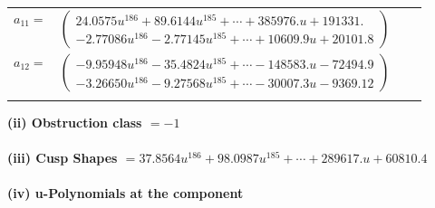\documentclass[1p]{elsarticle_modified}
\theoremstyle{definition}
\begin{document}
\begin{tabular}{m{7pt} m{180pt} m{7pt} m{180pt} }
\flushright $a_{11}=$&$\begin{pmatrix}24.0575 u^{186}+89.6144 u^{185}+\cdots+385976. u+191331.\\-2.77086 u^{186}-2.77145 u^{185}+\cdots+10609.9 u+20101.8\end{pmatrix}$ \\
\flushright $a_{12}=$&$\begin{pmatrix}-9.95948 u^{186}-35.4824 u^{185}+\cdots-148583. u-72494.9\\-3.26650 u^{186}-9.27568 u^{185}+\cdots-30007.3 u-9369.12\end{pmatrix}$\\&\end{tabular}
\flushleft \textbf{(ii) Obstruction class $= -1$}\\~\\
\flushleft \textbf{(iii) Cusp Shapes $= 37.8564 u^{186}+98.0987 u^{185}+\cdots+289617. u+60810.4$}\\~\\
\newpage\renewcommand{\arraystretch}{1}
\flushleft \textbf{(iv) u-Polynomials at the component}\newline \\
\end{document}
